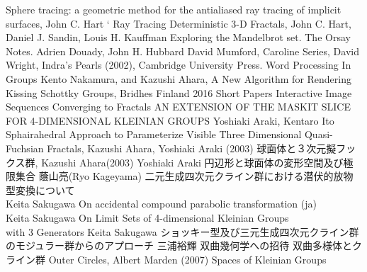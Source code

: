 {
\setlength{\baselineskip}{13pt}
\begin{thebibliography}{99}

        Sphere tracing: a geometric method for the antialiased ray tracing of implicit surfaces, John C. Hart
`
         Ray Tracing Deterministic 3-D Fractals,
         John C. Hart, Daniel J. Sandin, Louis H. Kauffman
         Exploring the Mandelbrot set. The Orsay Notes.
         Adrien Douady, John H. Hubbard
         David Mumford, Caroline Series, David Wright, Indra's Pearls
         (2002), Cambridge University Press.
         Word Processing In Groups
         Kento Nakamura, and Kazushi Ahara, A New Algorithm for
         Rendering Kissing Schottky Groups,
         Bridhes Finland 2016 Short Papers
        Interactive Image Sequences Converging to Fractals
        AN EXTENSION OF THE MASKIT SLICE FOR 4-DIMENSIONAL KLEINIAN GROUPS
        Yoshiaki Araki, Kentaro Ito
        Sphairahedral Approach to Parameterize Visible Three Dimensional Quasi-Fuchsian Fractals,
        Kazushi Ahara, Yoshiaki Araki (2003)
        球面体と３次元擬フックス群,
        Kazushi Ahara(2003)
        Yoshiaki Araki
        円辺形と球面体の変形空間及び極限集合
        蔭山亮(Ryo Kageyama)
        二元生成四次元クライン群における潜伏的放物型変換について\\
        Keita Sakugawa
        On accidental compound parabolic transformation (ja)\\
        Keita Sakugawa
        On Limit Sets of 4-dimensional Kleinian Groups\\
with 3 Generators
        Keita Sakugawa
        ショッキー型及び三元生成四次元クライン群のモジュラー群からのアプローチ
        三浦裕輝
        双曲幾何学への招待
        双曲多様体とクライン群
        Outer Circles, Albert Marden (2007)
        Spaces of Kleinian Groups
\end{thebibliography}
}